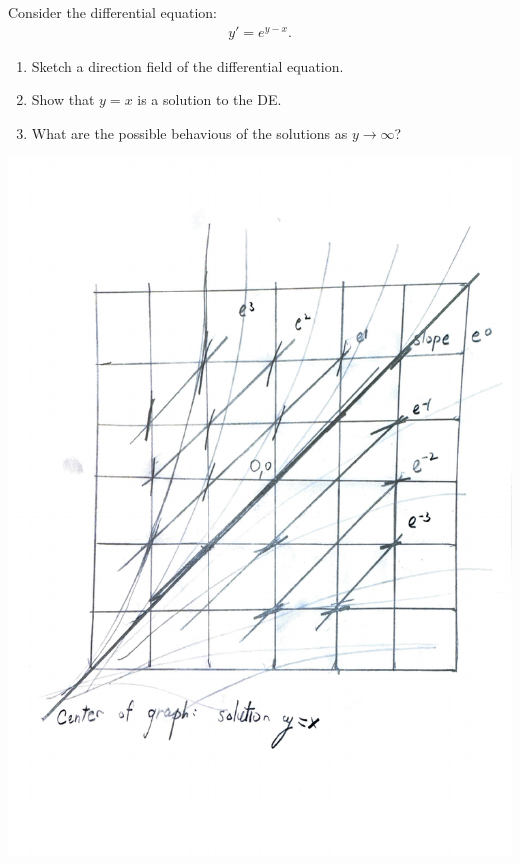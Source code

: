 \documentclass{article}
\begin{document}
    \newpage
    \begin{problem}
        Consider the differential equation:
        \begin{align}
            y' = e^{y-x}.
        \end{align}
        \begin{enumerate}
            \item Sketch a direction field of the differential equation.
            \item Show that $y=x$ is a solution to the DE.
            \item What are the possible behavious of the solutions as $y \rightarrow \infty$?
        \end{enumerate}
    \end{problem}
    \begin{solution}[Solution 2a]
        \hfill \break
        \begin{center}
            \includegraphics[scale=0.5]{images/2/A.pdf}
        \end{center}
    \end{solution}
\end{document}
